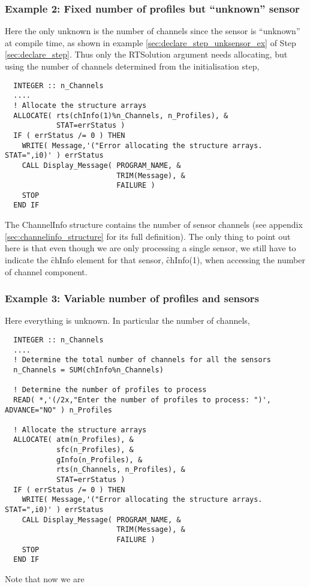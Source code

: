 \subsubsection{Example 2: Fixed number of profiles but ``unknown'' sensor}
Here the only unknown is the number of channels since the sensor is ``unknown'' at compile time, as shown in example \ref{sec:declare_step_unksensor_ex} of Step \ref{sec:declare_step}. Thus only the RTSolution argument needs allocating, but using the number of channels determined from the initialisation step,
\begin{ttfamily}
  \begin{verbatim}
  INTEGER :: n_Channels
  ....
  ! Allocate the structure arrays
  ALLOCATE( rts(chInfo(1)%n_Channels, n_Profiles), &
            STAT=errStatus )
  IF ( errStatus /= 0 ) THEN 
    WRITE( Message,'("Error allocating the structure arrays. STAT=",i0)' ) errStatus
    CALL Display_Message( PROGRAM_NAME, &
                          TRIM(Message), & 
                          FAILURE )
    STOP
  END IF\end{verbatim}
\end{ttfamily}
The ChannelInfo structure contains the number of sensor channels (see appendix \ref{sec:channelinfo_structure} for its full definition). The only thing to point out here is that even though we are only processing a single sensor, we still have to indicate the \f{chInfo} element for that sensor, \f{chInfo(1)}, when accessing the number of channel component.


\subsubsection{Example 3: Variable number of profiles and sensors}
Here everything is unknown. In particular the number of channels,
\begin{ttfamily}
  \begin{verbatim}
  INTEGER :: n_Channels
  ....
  ! Determine the total number of channels for all the sensors
  n_Channels = SUM(chInfo%n_Channels)
  
  ! Determine the number of profiles to process
  READ( *,'(/2x,"Enter the number of profiles to process: ")', ADVANCE="NO" ) n_Profiles
  
  ! Allocate the structure arrays
  ALLOCATE( atm(n_Profiles), &
            sfc(n_Profiles), &
            gInfo(n_Profiles), &
            rts(n_Channels, n_Profiles), &
            STAT=errStatus )
  IF ( errStatus /= 0 ) THEN 
    WRITE( Message,'("Error allocating the structure arrays. STAT=",i0)' ) errStatus
    CALL Display_Message( PROGRAM_NAME, &
                          TRIM(Message), & 
                          FAILURE )
    STOP
  END IF\end{verbatim}
\end{ttfamily}
Note that now we are 
